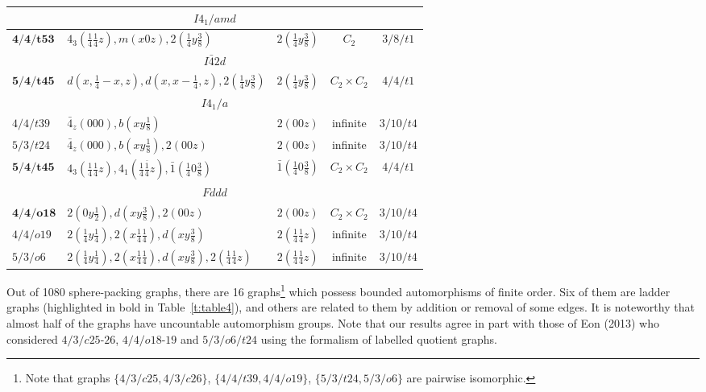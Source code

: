 \documentclass[11pt,a4paper]{article}
\newcommand{\bolit}{\boldsymbol}
\begin{document}
{\begin{table}[H]
\begin{center}
\begin{tabular}{|l|l|c|c|c|}
\hline
\multicolumn{5}{|c|}{$I4_1/amd$} \\
\hline
\rule{0pt}{2.5ex} $\bolit {4/4/t53}$ & $4_3(\frac{1}{4}\frac{1}{4}z), m(x0z), 2(\frac{1}{4}y\frac{3}{8})$ & $2(\frac{1}{4}y\frac{3}{8})$ & $C_2$ & $3/8/t1$ \\
\hline
\multicolumn{5}{|c|}{$I\bar42d$} \\
\hline
\rule{0pt}{2.5ex} $\bolit {5/4/t45}$ & $d(x,\frac{1}{4}-x,z), d(x,x-\frac{1}{4},z), 2(\frac{1}{4}y\frac{3}{8})$ & $2(\frac{1}{4}y\frac{3}{8})$ & $C_2 \times C_2$ & $4/4/t1$ \\
\hline
\multicolumn{5}{|c|}{$I4_1/a$} \\
\hline
\rule{0pt}{2.5ex} $4/4/t39$ &  $\bar4_z(000), b(xy\frac{1}{8})$ & $2(00z)$ & infinite & $3/10/t4$ \\
\rule{0pt}{2.5ex} $5/3/t24$ &  $\bar4_z(000), b(xy\frac{1}{8}), 2(00z)$ & $2(00z)$ & infinite & $3/10/t4$ \\
\rule{0pt}{2.5ex} $\bolit {5/4/t45}$ &  $4_3(\frac{1}{4}\frac{1}{4}z), 4_1(\frac{1}{4}\frac{\bar1}{4}z), \bar1(\frac{1}{4}0\frac{3}{8})$ & $\bar1(\frac{1}{4}0\frac{3}{8})$ & $C_2 \times C_2$ & $4/4/t1$ \\
\hline
\multicolumn{5}{|c|}{$Fddd$} \\
\hline
\rule{0pt}{2.5ex} $\bolit {4/4/o18}$ &  $2(0y\frac{1}{2}), d(xy\frac{3}{8}), 2(00z)$ & $2(00z)$ & $C_2 \times C_2$ &  $3/10/t4$ \\
\rule{0pt}{2.5ex} $4/4/o19$ &  $2(\frac{1}{4}y\frac{1}{4}), 2(x\frac{1}{4}\frac{1}{4}), d(xy\frac{3}{8})$ & $2(\frac{1}{4}\frac{1}{4}z)$ & infinite & $3/10/t4$ \\
\rule{0pt}{2.5ex} $5/3/o6$  &  $2(\frac{1}{4}y\frac{1}{4}), 2(x\frac{1}{4}\frac{1}{4}), d(xy\frac{3}{8}), 2(\frac{1}{4}\frac{1}{4}z)$ & $2(\frac{1}{4}\frac{1}{4}z)$ & infinite & $3/10/t4$ \\
\hline
\end{tabular}
\end{center}
\end{table}
}

Out of 1080 sphere-packing graphs, there are 16 graphs\footnote{Note that graphs $\{4/3/c25, 4/3/c26\}$, $\{4/4/t39, 4/4/o19\}$, $\{5/3/t24, 5/3/o6\}$ are pairwise isomorphic.} which possess bounded automorphisms of finite order. Six of them are ladder graphs (highlighted in bold in Table~\ref{t:table4}), and others are related to them by addition or removal of some edges. It is noteworthy that almost half of the graphs have uncountable automorphism groups. Note that our results agree in part with those of Eon (2013) \cite{Eon2013} who considered $4/3/c25\text{-}26$, $4/4/o18\text{-}19$ and $5/3/o6/t24$ using the formalism of labelled quotient graphs.
\end{document}
